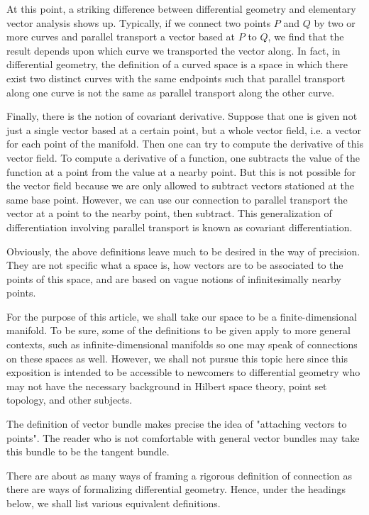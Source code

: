 \documentclass[12pt]{article}
\begin{document}
At this point, a striking difference between differential geometry and elementary vector analysis shows up.  Typically, if we connect two points $P$ and $Q$ by two or more curves and parallel transport a vector based at $P$ to $Q$, we find that the result depends upon which curve we transported the vector along.  In fact, in differential geometry, the definition of a curved space is a space in which there exist two distinct curves with the same endpoints such that parallel transport along one curve is not the same as parallel transport along the other curve.

Finally, there is the notion of covariant derivative.  Suppose that one is given not just a single vector based at a certain point, but a whole vector field, i.e. a vector for each point of the manifold.  Then one can try to compute the derivative of this vector field.  To compute a derivative of a function, one subtracts the value of the function at a point from the value at a nearby point.  But this is not possible for the vector field because we are only allowed to subtract vectors stationed at the same base point.  However, we can use our connection to parallel transport the vector at a point to the nearby point, then subtract.  This generalization of differentiation involving parallel transport is known as covariant differentiation.

Obviously, the above definitions leave much to be desired in the way of precision.  They are not specific what a space is, how vectors are to be associated to the points of this space, and are based on vague notions of infinitesimally nearby points.

For the purpose of this article, we shall take our space to be a finite-dimensional manifold.  To be sure, some of the definitions to be given apply to more general contexts, such as infinite-dimensional manifolds so one may speak of connections on these spaces as well.  However, we shall not pursue this topic here since this exposition is intended to be accessible to newcomers to differential geometry who may not have the necessary background in Hilbert space theory, point set topology, and other subjects.

The definition of vector bundle makes precise the idea of "attaching vectors to points".  The reader who is not comfortable with general vector bundles may take this bundle to be the tangent bundle.

There are about as many ways of framing a rigorous definition of connection as there are ways of formalizing differential geometry.  Hence, under the headings below, we shall list various equivalent definitions.
\end{document}
